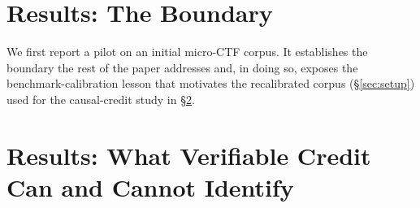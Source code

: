 \documentclass[10pt,twocolumn]{article}
\begin{document}
\section{Results: The Boundary}\label{sec:results}
\noindent We first report a pilot on an initial micro-CTF corpus. It establishes the
boundary the rest of the paper addresses and, in doing so, exposes the
benchmark-calibration lesson that motivates the recalibrated corpus
(\S\ref{sec:setup}) used for the causal-credit study in \S\ref{sec:results2}.


\section{Results: What Verifiable Credit Can and Cannot Identify}\label{sec:results2}



\end{document}

